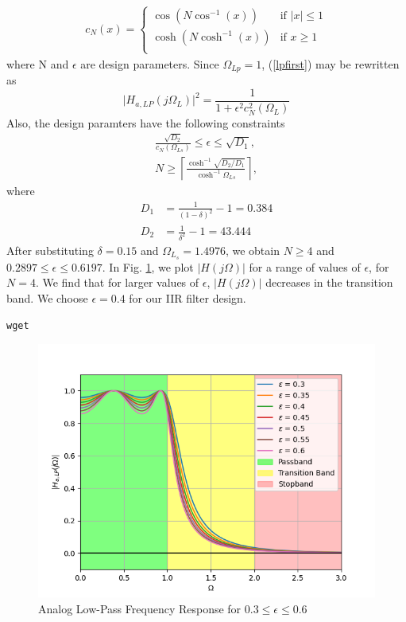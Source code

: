 \documentclass{article}
\begin{document}
\begin{enumerate}
\begin{align*}
    c_N(x) = \begin{cases}
        \cos(N\cos^{-1}(x)) & \text{if } \lvert x \rvert \leq 1\\
        \operatorname{cosh}(N\cosh^{-1}(x)) & \text{if } x \geq 1\\
    \end{cases}
\end{align*}
where N and $\epsilon$ are design parameters.  Since $\Omega_{Lp} = 1$, (\ref{lpfirst}) may be rewritten as
\begin{equation}
\label{lpsecond}
\vert H_{a,LP}(j\Omega_L)\vert^2 = \frac{1}{1 + \epsilon^2c_N^2(\Omega_L)}
\end{equation}
Also, the design paramters have the following constraints
\begin{eqnarray}
\label{lpdesign}
\frac{\sqrt{D_2}}{c_N(\Omega_{Ls})} \leq \epsilon \leq \sqrt{D_1}, \nonumber \\
N \geq \left\lceil \frac{\cosh^{-1}\sqrt{D_2/D_1}}{\cosh^{-1}\Omega_{Ls}} \right\rceil,
\end{eqnarray}
where 
\begin{align*}
    D_1 &= \frac{1}{(1 - \delta)^2}-1 = 0.384\\
    D_2 &= \frac{1}{\delta^2} - 1 = 43.444
\end{align*}
After substituting $\delta = 0.15$ and $\Omega_{L_s} = 1.4976$, 
we obtain $N \geq 4$ and $0.2897 \leq \epsilon \leq 0.6197$.  In Fig. \ref{fig:low_pass}, we plot $\vert H(j\Omega)\vert$ for a range of values of $\epsilon$, for $N = 4$.  We find that for larger values of $\epsilon$, $|H(j\Omega)|$ decreases in the transition band.  We choose $\epsilon = 0.4$  for our IIR filter design.
\begin{lstlisting}[caption = {Code for Figure 1}]
wget 
\end{lstlisting}
\begin{figure}[!h]
    \centering
    \includegraphics[width = \columnwidth]{figs/low_pass.png}
    \caption{Analog Low-Pass Frequency Response for $0.3 \leq \epsilon \leq 0.6$}
    \label{fig:low_pass}
\end{figure}


\end{enumerate}
\end{document}
